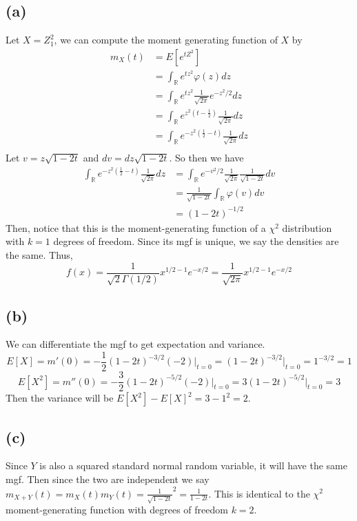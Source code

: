 \documentclass{article}
\theoremstyle{definition}
\begin{document}
\subsection*{(a)}
Let $X = Z_1^2$, we can compute the moment generating function of $X$ by
\begin{align*}
    m_{X}(t) &= E[e^{tZ^2}]\\
    &= \int_\mathbb{R} e^{tz^2}  \varphi (z) dz\\
    &= \int_\mathbb{R} e^{tz^2}  \frac{1}{\sqrt{2\pi}} e^{-z^2 / 2} dz \\
    &= \int_\mathbb{R} e^{z^2 (t - \frac{1}{2})} \frac{1}{\sqrt{2\pi}} dz \\
    &= \int_\mathbb{R} e^{-z^2 (\frac{1}{2} - t)} \frac{1}{\sqrt{2\pi}} dz \\
\end{align*}
Let $v = z\sqrt{1 - 2t}$ and $dv = dz\sqrt{1-2t}$. So then we have 
\begin{align*}
    \int_\mathbb{R} e^{-z^2 (\frac{1}{2} - t)} \frac{1}{\sqrt{2\pi}} dz &= \int_\mathbb{R} e^{-v^2 / 2} \frac{1}{\sqrt{2\pi}} \frac{1}{\sqrt{1-2t}} dv\\
    &= \frac{1}{\sqrt{1 - 2t}} \int_\mathbb{R} \varphi (v) dv \\
    &= (1-2t)^{-1 / 2}
\end{align*}
Then, notice that this is the moment-generating function of a $\chi^2$ distribution with $k = 1$ degrees of freedom. Since its mgf is unique, we say 
the densities are the same.
Thus,
\[
    f(x) = \frac{1}{\sqrt{2} \Gamma (1 / 2)}x^{1 / 2 - 1}e^{-x/2} = \frac{1}{\sqrt{2\pi}}x^{1 / 2 - 1}e^{-x/2}
\]
\subsection*{(b)}
We can differentiate the mgf to get expectation and variance.
\[
    E[X] = m'(0) = -\frac{1}{2} (1-2t)^{-3 / 2} (-2) \bigg|_{t=0} = (1-2t)^{-3 / 2}\bigg|_{t=0} = 1^{-3 / 2} = 1
\]
\[
    E[X^2] = m''(0) = -\frac{3}{2} (1 - 2t)^{-5 / 2} (-2) \bigg|_{t = 0} = 3(1 - 2t)^{-5 / 2} \bigg|_{t = 0} = 3
\]
Then the variance will be $E[X^2] - E[X]^2 = 3 - 1^2 = 2$.
\subsection*{(c)}
Since $Y$ is also a squared standard normal random variable, it will have the same mgf. Then since the two are independent we say
$m_{X + Y}(t) = m_X(t) m_Y(t) = \frac{1}{\sqrt{1-2t}}^2 = \frac{1}{1-2t}$. This is identical to the $\chi^2$ moment-generating function with degrees of freedom $k = 2$.
\end{document}
